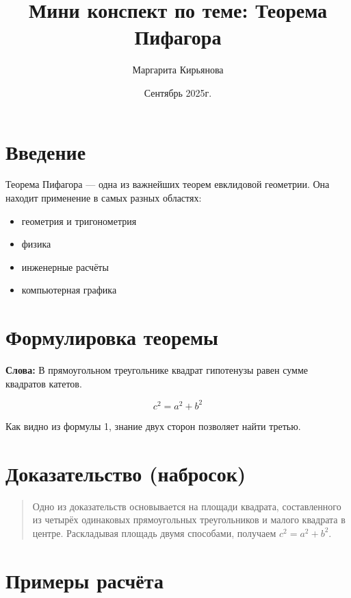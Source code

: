 \documentclass{article}
\title{Мини конспект по теме: Теорема Пифагора}
\author{Маргарита Кирьянова}
\date{Сентябрь 2025г.}
\begin{document}
\maketitle
\tableofcontents

\newpage
\section{Введение}
\begin{flushleft}
    Теорема Пифагора — одна из важнейших теорем евклидовой геометрии. Она находит применение в самых разных областях:
\end{flushleft}
\begin{itemize}
    \item геометрия и тригонометрия
    \item физика
    \item инженерные расчёты
    \item компьютерная графика
\end{itemize}

\section{Формулировка теоремы}
\begin{flushleft}
    \textbf{Слова:} В прямоугольном треугольнике квадрат гипотенузы равен сумме квадратов катетов.
\end{flushleft}
\begin{equation}
    c^2 = a^2 + b^2
\end{equation}  
\begin{center}
    Как видно из формулы 1, знание двух сторон позволяет найти третью.
\end{center}

\section{Доказательство (набросок)}
\begin{quote}
    Одно из доказательств основывается на площади квадрата, составленного
 из четырёх одинаковых прямоугольных треугольников и малого квадрата
 в центре. Раскладывая площадь двумя способами, получаем $c^2 = a^2 +b^2$.
\end{quote}


\section{Примеры расчёта}
\end{document}

